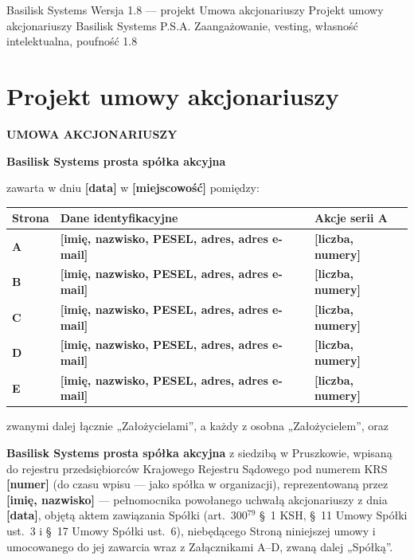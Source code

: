 \documentclass[12pt,a4paper]{report}
\newcommand{\field}[1]{\textbf{[#1]}}
\newcommand{\CompanyFull}{Basilisk Systems prosta spółka akcyjna}
\newcommand{\US}[1]{§~#1 Umowy Spółki}
\begin{document}
\BusinessPlanTitlePage
  {Basilisk Systems}
  {Wersja 1.8 --- projekt}
  {Umowa akcjonariuszy}
  {Projekt umowy akcjonariuszy Basilisk Systems P.S.A.}
  {Zaangażowanie, vesting, własność intelektualna, poufność}
  {1.8}

\tableofcontents
\newpage

\chapter*{Projekt umowy akcjonariuszy}

\begin{center}
{\Large\bfseries UMOWA AKCJONARIUSZY}\par
\vspace{0.25cm}
{\LARGE\bfseries \CompanyFull}\par
\vspace{0.6cm}
\end{center}

zawarta w dniu \field{data} w \field{miejscowość} pomiędzy:

\begin{center}
\begin{tabularx}{\textwidth}{>{\bfseries}p{1.6cm} >{\raggedright\arraybackslash}X >{\raggedright\arraybackslash}p{3.2cm}}
\toprule
Strona & Dane identyfikacyjne & Akcje serii A \\
\midrule
A & \field{imię, nazwisko, PESEL, adres, adres e-mail} & \field{liczba, numery} \\
B & \field{imię, nazwisko, PESEL, adres, adres e-mail} & \field{liczba, numery} \\
C & \field{imię, nazwisko, PESEL, adres, adres e-mail} & \field{liczba, numery} \\
D & \field{imię, nazwisko, PESEL, adres, adres e-mail} & \field{liczba, numery} \\
E & \field{imię, nazwisko, PESEL, adres, adres e-mail} & \field{liczba, numery} \\
\bottomrule
\end{tabularx}
\end{center}

zwanymi dalej łącznie „Założycielami”, a każdy z osobna „Założycielem”, oraz

\textbf{\CompanyFull} z siedzibą w Pruszkowie, wpisaną do rejestru przedsiębiorców Krajowego Rejestru Sądowego pod numerem KRS \field{numer} (do czasu wpisu --- jako spółka w organizacji), reprezentowaną przez \field{imię, nazwisko} --- pełnomocnika powołanego uchwałą akcjonariuszy z dnia \field{data}, objętą aktem zawiązania Spółki (art.~300$^{79}$ §~1 KSH, \US{11} ust.~3 i \US{17} ust.~6), niebędącego Stroną niniejszej umowy i umocowanego do jej zawarcia wraz z Załącznikami A--D, zwaną dalej „Spółką”.
\end{document}
